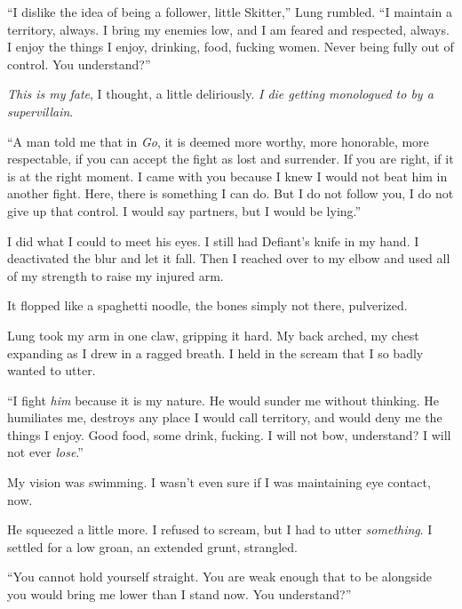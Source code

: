 ``I dislike the idea of being a follower, little Skitter,'' Lung rumbled.  ``I maintain a territory, always.  I bring my enemies low, and I am feared and respected, always.  I enjoy the things I enjoy, drinking, food, fucking women.  Never being fully out of control.  You understand?''



\emph{This is my fate}, I thought, a little deliriously.  \emph{I die getting monologued to by a supervillain}.



``A man told me that in\emph{ Go}, it is deemed more worthy, more honorable, more respectable, if you can accept the fight as lost and surrender.  If you are right, if it is at the right moment.  I came with you because I knew I would not beat him in another fight.  Here, there is something I can do.  But I do not follow you, I do not give up that control.  I would say partners, but I would be lying.''



I did what I could to meet his eyes.  I still had Defiant's knife in my hand.  I deactivated the blur and let it fall.  Then I reached over to my elbow and used all of my strength to raise my injured arm.



It flopped like a spaghetti noodle, the bones simply not there, pulverized.



Lung took my arm in one claw, gripping it hard.  My back arched, my chest expanding as I drew in a ragged breath.  I held in the scream that I so badly wanted to utter.



``I fight \emph{him} because it is my nature.  He would sunder me without thinking.  He humiliates me, destroys any place I would call territory, and would deny me the things I enjoy.  Good food, some drink, fucking.  I will not bow, understand?  I will not ever \emph{lose}.''



My vision was swimming.  I wasn't even sure if I was maintaining eye contact, now.



He squeezed a little more.  I refused to scream, but I had to utter \emph{something}.  I settled for a low groan, an extended grunt, strangled.



``You cannot hold yourself straight.  You are weak enough that to be alongside you would bring me lower than I stand now.  You understand?''




